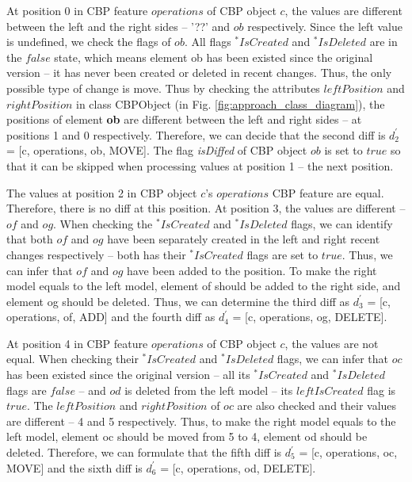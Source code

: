 \documentclass{llncs}
\begin{document}
At position 0 in CBP feature $operations$ of CBP object $c$, the values are different between the left and the right sides -- '??' and $ob$ respectively. Since the left value is undefined, we check the flags of $ob$. All flags $^*IsCreated$ and $^*IsDeleted$ are in the $false$ state, which means element \textsf{ob} has been existed since the original version -- it has never been created or deleted in recent changes. Thus, the only possible type of change is move. Thus by checking the attributes $leftPosition$ and $rightPosition$ in class \textsf{CBPObject} (in Fig. \ref{fig:approach_class_diagram}), the positions of element \textbf{ob} are different between the left and right sides -- at positions 1 and 0 respectively. Therefore, we can decide that the second diff is $d_2^\prime$ = [\textsf{c}, \textsf{operations}, \textsf{ob}, \textsf{MOVE}]. The flag \textit{isDiffed} of CBP object $ob$ is set to $true$ so that it can be skipped when processing values at position 1 -- the next position.  

The values at position 2 in CBP object $c$'s $operations$ CBP feature are equal. Therefore, there is no diff at this position. At position 3, the values are different -- $of$ and $og$. When checking the $^*IsCreated$ and $^*IsDeleted$ flags, we can identify that both $of$ and $og$ have been separately created in the left and right recent changes respectively -- both has their $^*IsCreated$ flags are set to $true$. Thus, we can infer that $of$ and $og$ have been added to the position. To make the right model equals to the left model, element \textsf{of} should be added to the right side, and element \textsf{og} should be deleted. Thus, we can determine the third diff as $d_3^\prime$ = [\textsf{c}, \textsf{operations}, \textsf{of}, \textsf{ADD}] and the fourth diff as $d_4^\prime$ = [\textsf{c}, \textsf{operations}, \textsf{og}, \textsf{DELETE}].

At position 4 in CBP feature $operations$ of CBP object $c$, the values are not equal. When checking their $^*IsCreated$ and $^*IsDeleted$ flags, we can infer that $oc$ has been existed since the original version -- all its $^*IsCreated$ and $^*IsDeleted$ flags are $false$ -- and $od$ is deleted from the left model -- its $leftIsCreated$ flag is $true$. The $leftPosition$ and $rightPosition$ of $oc$ are also checked and their values are different -- 4 and 5 respectively. Thus, to make the right model equals to the left model, element \textsf{oc} should be moved from 5 to 4, element \textsf{od} should be deleted. Therefore, we can formulate  that the fifth diff is $d_5^\prime$ = [\textsf{c}, \textsf{operations}, \textsf{oc}, \textsf{MOVE}] and the sixth diff is $d_6^\prime$ = [\textsf{c}, \textsf{operations}, \textsf{od}, \textsf{DELETE}]. 
\end{document}
